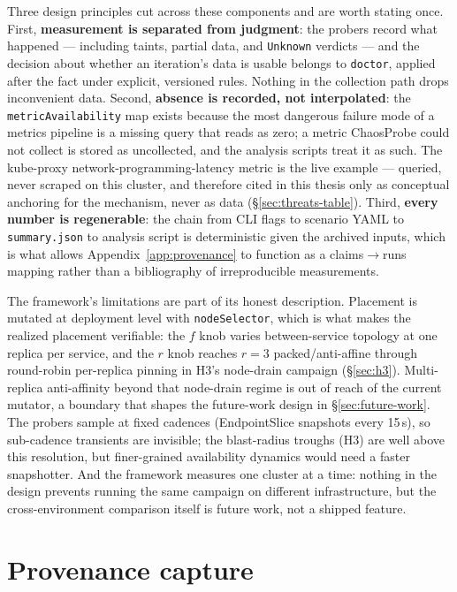 Three design principles cut across these components and are worth stating
once. First, \textbf{measurement is separated from judgment}: the probers record
what happened --- including taints, partial data, and \texttt{Unknown} verdicts ---
and the decision about whether an iteration's data is usable belongs to
\texttt{doctor}, applied after the fact under explicit, versioned rules. Nothing
in the collection path drops inconvenient data. Second, \textbf{absence is
recorded, not interpolated}: the \texttt{metricAvailability} map exists because
the most dangerous failure mode of a metrics pipeline is a missing query
that reads as zero; a metric ChaosProbe could not collect is stored as
uncollected, and the analysis scripts treat it as such. The kube-proxy
network-programming-latency metric is the live example --- queried, never
scraped on this cluster, and therefore cited in this thesis only as
conceptual anchoring for the mechanism, never as data (\S\ref{sec:threats-table}). Third,
\textbf{every number is regenerable}: the chain from CLI flags to scenario YAML
to \texttt{summary.json} to analysis script is deterministic given the archived
inputs, which is what allows Appendix~\ref{app:provenance} to function as a claims$\rightarrow$runs
mapping rather than a bibliography of irreproducible measurements.

The framework's limitations are part of its honest description. Placement
is mutated at deployment level with \texttt{nodeSelector}, which is what makes
the realized placement verifiable: the $f$ knob varies between-service topology
at one replica per service, and the $r$ knob reaches $r{=}3$ packed/anti-affine
through round-robin per-replica pinning in H3's node-drain campaign
(\S\ref{sec:h3}). Multi-replica anti-affinity beyond that node-drain regime is
out of reach of the current mutator, a boundary that shapes the future-work
design in \S\ref{sec:future-work}. The probers sample at fixed cadences (EndpointSlice
snapshots every 15\,s), so sub-cadence transients are invisible; the
blast-radius troughs (H3) are well above this resolution, but finer-grained
availability dynamics would need a faster snapshotter. And the framework
measures one cluster at a time: nothing in the design prevents running the
same campaign on different infrastructure, but the cross-environment
comparison itself is future work, not a shipped feature.

\section{Provenance capture}\label{sec:provenance}

